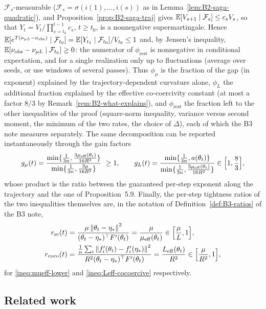 $\mathcal F_s$-measurable ($\mathcal F_s=\sigma(i(1),\dots,i(s))$ as in Lemma~\ref{lem:B2-saga-quadratic}), and
Proposition~\ref{prop:B2-saga-traj} gives $\mathbb{E}[V_{s+1}\mid\mathcal F_s]\le c_sV_s$, so that
$Y_t=V_t/\prod_{s=t_0}^{t-1}c_s$, $t\ge t_0$, is a nonnegative supermartingale. Hence
$\mathbb{E}[e^{T(\nu_{\mu L}-\nu_{\mathrm{obs}})}\mid\mathcal F_{t_0}]=\mathbb{E}[Y_{t_1}\mid\mathcal F_{t_0}]/V_{t_0}\le1$ and, by
Jensen's inequality, $\mathbb{E}[\nu_{\mathrm{obs}}-\nu_{\mu L}\mid\mathcal F_{t_0}]\ge0$: the numerator of $\phi_{\mathrm{rest}}$
is nonnegative in conditional expectation, and for a single realization only up to fluctuations (average over seeds,
or use windows of several passes). Thus $\phi_\mu$ is the fraction of the gap (in exponent) explained by the
trajectory-dependent curvature alone, $\phi_L$ the additional fraction explained by the effective
co-coercivity constant (at most a factor $8/3$ by Remark~\ref{rem:B2-what-explains}), and $\phi_{\mathrm{rest}}$ the
fraction left to the other inequalities of the proof (square-norm inequality, variance versus second moment,
the minimum of the two rates, the choice of $\Delta$), each of which the B3 note measures separately. The same
decomposition can be reported instantaneously through the gain factors
\[
g_\mu(t)=\frac{\min\{\frac1{3n},\frac{3\muEff(\theta_t)}{16R^2}\}}{\min\{\frac1{3n},\frac{3\mu}{16R^2}\}}\ \ge1,\qquad
g_L(t)=\frac{\min\{\frac1{3n},a(\theta_t)\}}{\min\{\frac1{3n},\frac{3\muEff(\theta_t)}{16R^2}\}}\in\Big[1,\frac83\Big],
\]
whose product is the ratio between the guaranteed per-step exponent along the trajectory and the one of
Proposition~5.9. Finally, the per-step tightness ratios of the two inequalities themselves are, in the notation of
Definition~\ref{def:B3-ratios} of the B3 note,
\begin{align*}
r_{\mathrm{sc}}(t)&=\frac{\mu\left\|\theta_t-\eta_\ast\right\|^2}{(\theta_t-\eta_\ast)^\top F'(\theta_t)}=\frac{\mu}{\mu_{\mathrm{eff}}(\theta_t)}\in\Big[\frac\mu L,1\Big],\\
r_{\mathrm{coco}}(t)&=\frac{\frac1n\sum_i\left\|f'_i(\theta_t)-f'_i(\eta_\ast)\right\|^2}{R^2(\theta_t-\eta_\ast)^\top F'(\theta_t)}=\frac{L_{\mathrm{eff}}(\theta_t)}{R^2}\in\Big[\frac\mu{R^2},1\Big],
\end{align*}
for \eqref{ineq:mueff-lower} and \eqref{ineq:Leff-cocoercive} respectively.

\subsection{Related work}\label{sec:B2-related}

